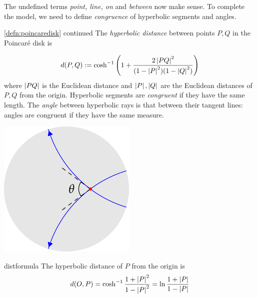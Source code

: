 The undefined terms \emph{point, line, on} and \emph{between} now make sense. To complete the model, we need to define \emph{congruence} of hyperbolic segments and angles.

\begin{defn*}{\ref{defn:poincaredisk} continued}
	The \emph{hyperbolic distance} between points $P,Q$ in the Poincaré disk is\footnotemark{}

	\begin{minipage}[t]{0.7\linewidth}\vspace{-12pt}
		\[
			d(P,Q):=\cosh^{-1}\left(1+\frac{2\left| PQ\right|^2}{(1-\left| P\right|^2)(1-\left| Q\right|^2)}\right)
		\]
		where $\left| PQ\right|$ is the Euclidean distance and $\left| P\right|,\left| Q\right|$ are the Euclidean distances of $P,Q$ from the origin.\smallbreak
		Hyperbolic segments are \emph{congruent} if they have the same length.\smallbreak
		The \emph{angle} between hyperbolic rays is that between their tangent lines: angles are congruent if they have the same measure.
	\end{minipage}
	\hfill
	\begin{minipage}[t]{0.29\linewidth}\vspace{-5pt}
		\flushright\includegraphics{models-angle}
	\end{minipage}
\end{defn*}

\begin{lemm}{}{distformula}
	The hyperbolic distance of $P$ from the origin is
	\[
		d(O,P)=\cosh^{-1}\frac{1+\left| P\right|^2}{1-\left| P\right|^2}=\ln\frac{1+\left| P\right|}{1-\left| P\right|}
	\]
\end{lemm}



